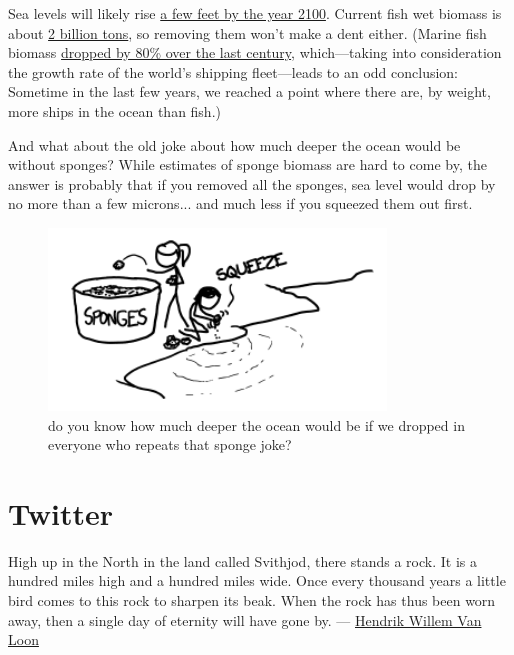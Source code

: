 {Sea levels will likely rise \href{}{a few feet by the year 2100}. Current fish wet biomass is about \href{http://phys.org/news151251277.html}{2 billion tons}, so removing them won’t make a dent either. (Marine fish biomass \href{http://news.aaas.org/2011\_annual\_meeting/0228declining-fisheries.shtml} {dropped by 80\% over the last century}, which—taking into consideration the growth rate of the world’s shipping fleet—leads to an odd conclusion: Sometime in the last few years, we reached a point where there are, by weight, more ships in the ocean than fish.)}

{And what about the old joke about how much deeper the ocean would be without sponges? While estimates of sponge biomass are hard to come by, the answer is probably that if you removed all the sponges, sea level would drop by no more than a few microns... and much less if you squeezed them out first.}

\begin{figure}[!htbp]
\centering
\includegraphics[scale=0.5, max width=0.8\textwidth]{imgs/a/33/ships_sponges.png}
\caption{do you know how much deeper the ocean would be if we dropped in everyone who repeats that sponge joke?}
\end{figure}

{
\chapter{Twitter}
}

\hfill{}

{High up in the North in the land called Svithjod, there stands a rock. It is a hundred miles high and a hundred miles wide. Once every thousand years a little bird comes to this rock to sharpen its beak. When the rock has thus been worn away, then a single day of eternity will have gone by.
— \href{http://books.google.com/books?id=RskHAAAAIAAJ&pg=PA1\#v=onepage&q&f=false}{Hendrik Willem Van Loon}}

